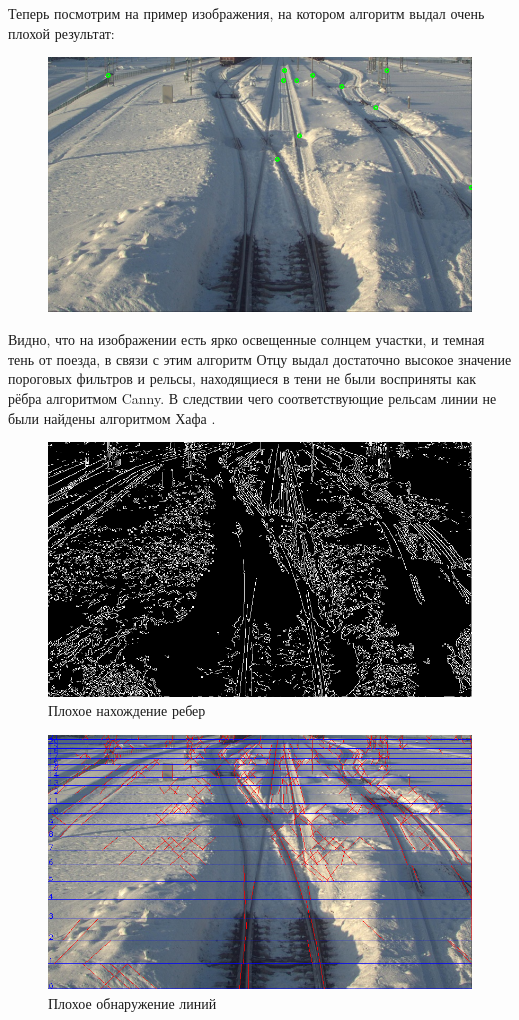 \newpage
Теперь посмотрим на пример изображения, на котором алгоритм выдал очень плохой результат:
\begin{figure}[h!]
	\centering
	\includegraphics[width=0.7\linewidth]{pictures/screenshot0018}
	\caption{}
	\label{fig:res4}
\end{figure}
Видно, что на изображении есть ярко освещенные солнцем участки, и темная тень от поезда, в связи с этим алгоритм Отцу \cite{b:otsu} выдал достаточно высокое значение пороговых фильтров и рельсы, находящиеся в тени не были восприняты как рёбра алгоритмом Canny\cite{b:canny}. В следствии чего соответствующие рельсам линии не были найдены алгоритмом Хафа \cite{b:hough_transform}.
\begin{figure}[h!]
	\centering
	\includegraphics[width=0.7\linewidth]{pictures/screenshot0019}
	\caption{Плохое нахождение ребер}
	\label{fig:bad_canny}
\end{figure}
\begin{figure}[h!]
	\centering
	\includegraphics[width=0.7\linewidth]{pictures/screenshot0020}
	\caption{Плохое обнаружение линий}
	\label{fig:bad_lines}
\end{figure}

